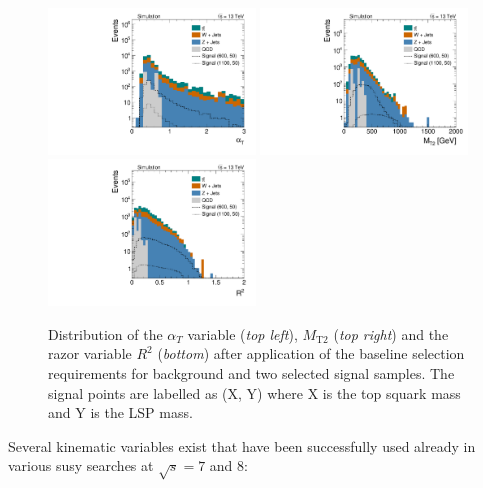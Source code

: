 \begin{figure}[!t]
  \centering
  \begin{minipage}[c]{1.\textwidth}
    \begin{center}
      \includegraphics[width=0.49\textwidth]{figures/Stop_DeltaPhiSelection_AlphaT.pdf}  
      \includegraphics[width=0.49\textwidth]{figures/Stop_DeltaPhiSelection_MT2.pdf} \\
      \includegraphics[width=0.49\textwidth]{figures/Stop_DeltaPhiSelection_Razor_R.pdf}
    \end{center}
  \end{minipage}

  \caption{Distribution of the $\alpha_T$ variable (\textit{top left}), $M_\mathrm{T2}$ (\textit{top right}) and  the razor variable $R^2$ (\textit{bottom}) after application of the baseline selection requirements for background and two selected signal samples. The signal points are labelled as (X, Y) where X is the top squark mass and Y is the LSP mass.}
  \label{fig:stop_baseline_kin_vars}
\end{figure}
Several kinematic variables exist that have been successfully used already in various susy searches at $\sqrt{s} = 7$ and 8\tev:
